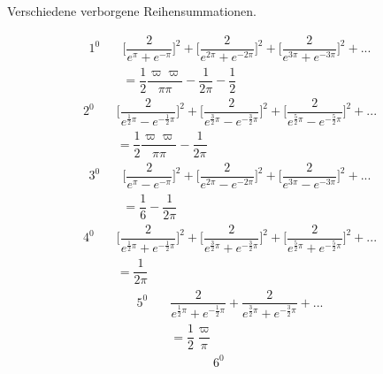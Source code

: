 \begingroup
\renewcommand{\arraystretch}{1.45}
\begin{center}Verschiedene verborgene Reihensummationen.\end{center}
\[
\begin{aligned}1^{0}\quad&
\biggl[\dfrac{2}{e^\pi+e^{-\pi}}\biggr]^2
+\biggl[\dfrac{2}{e^{2\pi}+e^{-2\pi}}\biggr]^2
+\biggl[\dfrac{2}{e^{3\pi}+e^{-3\pi}}\biggr]^2+\mathord{.}\mathord{.}\mathord{.}
\\[8pt]&=\dfrac12\dfrac{\varpi\varpi}{\pi\pi}-\dfrac{1}{2\pi}-\dfrac12\end{aligned}
\]
\[
\begin{aligned}2^{0}\quad&
\biggl[\dfrac{2}{e^{\frac12\pi}-e^{-\frac12\pi}}\biggr]^2
+\biggl[\dfrac{2}{e^{\frac32\pi}-e^{-\frac32\pi}}\biggr]^2
+\biggl[\dfrac{2}{e^{\frac52\pi}-e^{-\frac52\pi}}\biggr]^2+\mathord{.}\mathord{.}\mathord{.}
\\[8pt]&=\dfrac12\dfrac{\varpi\varpi}{\pi\pi}-\dfrac{1}{2\pi}\end{aligned}
\]
\[
\begin{aligned}3^{0}\quad&
\biggl[\dfrac{2}{e^\pi-e^{-\pi}}\biggr]^2
+\biggl[\dfrac{2}{e^{2\pi}-e^{-2\pi}}\biggr]^2
+\biggl[\dfrac{2}{e^{3\pi}-e^{-3\pi}}\biggr]^2+\mathord{.}\mathord{.}\mathord{.}
\\[8pt]&=\dfrac16-\dfrac{1}{2\pi}\end{aligned}
\]
\[
\begin{aligned}4^{0}\quad&
\biggl[\dfrac{2}{e^{\frac12\pi}+e^{-\frac12\pi}}\biggr]^2
+\biggl[\dfrac{2}{e^{\frac32\pi}+e^{-\frac32\pi}}\biggr]^2
+\biggl[\dfrac{2}{e^{\frac52\pi}+e^{-\frac52\pi}}\biggr]^2+\mathord{.}\mathord{.}\mathord{.}
\\[8pt]&=\dfrac{1}{2\pi}\end{aligned}
\]
\[
\begin{aligned}5^{0}\quad&
\dfrac{2}{e^{\frac12\pi}+e^{-\frac12\pi}}
+\dfrac{2}{e^{\frac32\pi}+e^{-\frac32\pi}}+\mathord{.}\mathord{.}\mathord{.}
\\[8pt]&=\dfrac12\dfrac\varpi\pi\end{aligned}
\]
\nopagebreak[4]
\[
\begin{aligned}6^{0}\quad&\end{aligned}
\]



